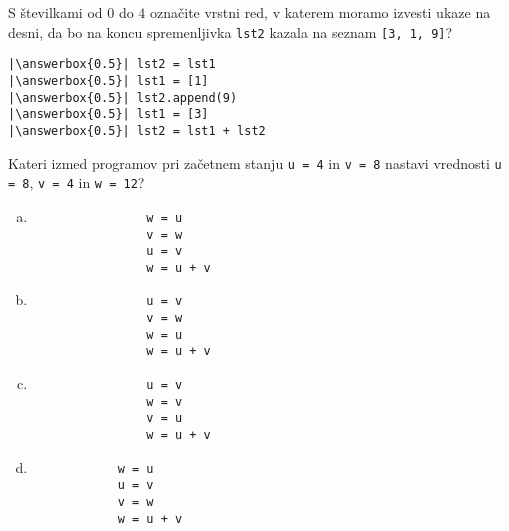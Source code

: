 \documentclass[arhiv, 10pt]{../izpit}
\newcommand{\inlinepy}[1]{\texttt{#1}}
\newcommand{\answerbox}[1]{\framebox{\vphantom{\large M}\hspace{#1cm}}}
\begin{document}
        \naloga*
        \begin{multicols}{2}
        \noindent 
        S številkami od $0$ do $4$ označite vrstni red, v katerem moramo izvesti ukaze na desni, da bo na koncu spremenljivka \inlinepy{lst2} kazala na seznam \inlinepy{[3, 1, 9]}?
    
        \columnbreak
        \noindent
        \begin{verbatim}
|\answerbox{0.5}| lst2 = lst1
|\answerbox{0.5}| lst1 = [1]
|\answerbox{0.5}| lst2.append(9)
|\answerbox{0.5}| lst1 = [3]
|\answerbox{0.5}| lst2 = lst1 + lst2

        \end{verbatim}
        \end{multicols}
    
            
        \naloga*
        
        Kateri izmed programov pri začetnem stanju
            \inlinepy{u = 4} in
            \inlinepy{v = 8}
        nastavi vrednosti
            \inlinepy{u = 8},
            \inlinepy{v = 4} in
            \inlinepy{w = 12}?
    
        \begin{multicols}{4}
        \begin{enumerate}[(a)]
\item 
                \begin{verbatim}
                w = u
                v = w
                u = v
                w = u + v
                \end{verbatim}
            
\item 
                \begin{verbatim}
                u = v
                v = w
                w = u
                w = u + v
                \end{verbatim}
            
\item 
                \begin{verbatim}
                u = v
                w = v
                v = u
                w = u + v
                \end{verbatim}
            
\item 
            \begin{verbatim}
            w = u
            u = v
            v = w
            w = u + v
            \end{verbatim}
        
\end{enumerate}

        \end{multicols}
    
\end{document}

